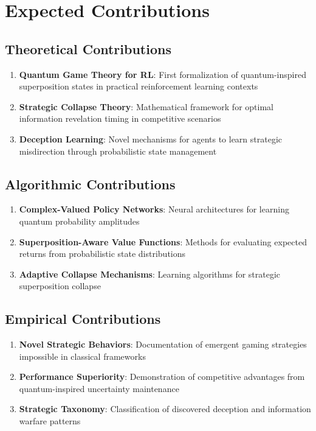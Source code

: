 \documentclass[11pt,a4paper]{article}
\begin{document}
\section{Expected Contributions}

\subsection{Theoretical Contributions}

\begin{enumerate}
\item \textbf{Quantum Game Theory for RL}: First formalization of quantum-inspired superposition states in practical reinforcement learning contexts
\item \textbf{Strategic Collapse Theory}: Mathematical framework for optimal information revelation timing in competitive scenarios
\item \textbf{Deception Learning}: Novel mechanisms for agents to learn strategic misdirection through probabilistic state management
\end{enumerate}

\subsection{Algorithmic Contributions}

\begin{enumerate}
\item \textbf{Complex-Valued Policy Networks}: Neural architectures for learning quantum probability amplitudes
\item \textbf{Superposition-Aware Value Functions}: Methods for evaluating expected returns from probabilistic state distributions
\item \textbf{Adaptive Collapse Mechanisms}: Learning algorithms for strategic superposition collapse
\end{enumerate}

\subsection{Empirical Contributions}

\begin{enumerate}
\item \textbf{Novel Strategic Behaviors}: Documentation of emergent gaming strategies impossible in classical frameworks
\item \textbf{Performance Superiority}: Demonstration of competitive advantages from quantum-inspired uncertainty maintenance
\item \textbf{Strategic Taxonomy}: Classification of discovered deception and information warfare patterns
\end{enumerate}
\end{document}
